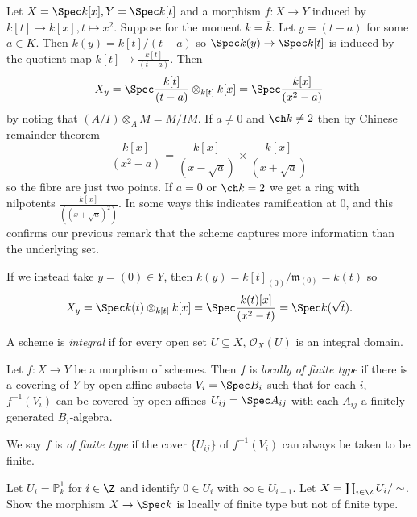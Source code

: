 \documentclass[a4paper]{article}
\renewcommand*{\P}{\mathbb{P}}
\newcommand{\sh}[1]{\mathcal{#1}} %
\begin{document}
\begin{eg}
  Let \(X = \Spec k[x], Y = \Spec k[t]\) and a morphism \(f: X \to Y\) induced by \(k[t] \to k[x], t \mapsto x^2\). Suppose for the moment \(k = \overline k\). Let \(y = (t - a)\) for some \(a \in K\). Then \(k(y) = k[t]/(t - a)\) so \(\Spec k(y) \to \Spec k[t]\) is induced by the quotient map \(k[t] \to \frac{k[t]}{(t - a)}\). Then
  \[
    X_y = \Spec \frac{k[t]}{(t - a)} \otimes_{k[t]} k[x] = \Spec \frac{k[x]}{(x^2 - a)}
  \]
  by noting that \((A/I) \otimes_A M = M/IM\). If \(a \neq 0\) and \(\ch k \neq 2\) then by Chinese remainder theorem
  \[
    \frac{k[x]}{(x^2 - a)} = \frac{k[x]}{(x - \sqrt a)} \times \frac{k[x]}{(x + \sqrt a)}
  \]
  so the fibre are just two points. If \(a = 0\) or \(\ch k = 2\) we get a ring with nilpotents \(\frac{k[x]}{((x + \sqrt a)^2)}\). In some ways this indicates ramification at \(0\), and this confirms our previous remark that the scheme captures more information than the underlying set.

    If we instead take \(y = (0) \in Y\), then \(k(y) = k[t]_{(0)}/\mathfrak m_{(0)} = k(t)\) so
    \[
      X_y = \Spec k(t) \otimes_{k[t]} k[x] = \Spec \frac{k(t)[x]}{(x^2 - t)} = \Spec k(\sqrt t).
    \]
\end{eg}

\begin{definition}
  A scheme is \emph{integral} if for every open set \(U \subseteq X\), \(\sh O_X(U)\) is an integral domain.
\end{definition}

\begin{definition}
  Let \(f: X \to Y\) be a morphism of schemes. Then \(f\) is \emph{locally of finite type} if there is a covering of \(Y\) by open affine subsets \(V_i = \Spec B_i\) such that for each \(i\), \(f^{-1}(V_i)\) can be covered by open affines \(U_{ij} = \Spec A_{ij}\) with each \(A_{ij}\) a finitely-generated \(B_i\)-algebra.

  We say \(f\) is \emph{of finite type} if the cover \(\{U_{ij}\}\) of \(f^{-1}(V_i)\) can always be taken to be finite.
\end{definition}

\begin{ex}
  Let \(U_i = \P^1_k\) for \(i \in \Z\) and identify \(0 \in U_i\) with \(\infty \in U_{i + 1}\). Let \(X = \coprod_{i \in \Z} U_i/\sim\). Show the morphism \(X \to \Spec k\) is locally of finite type but not of finite type.
\end{ex}
\end{document}
